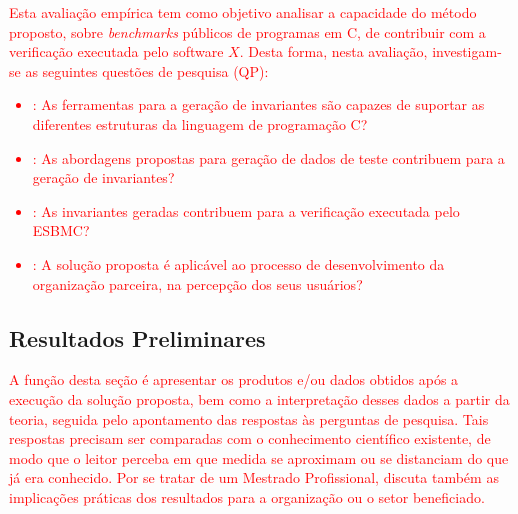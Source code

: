 
\textcolor{red}{Esta avaliação empírica tem como objetivo analisar a capacidade do método proposto, sobre \textit{benchmarks} públicos de programas em C, de contribuir com a verificação executada pelo software $X$. Desta forma, nesta avaliação, investigam-se as seguintes questões de pesquisa (QP):
%
\begin{itemize}
    \item[QP1]: As ferramentas para a geração de invariantes são capazes de suportar as diferentes estruturas da linguagem de programação C?
    \item[QP2]: As abordagens propostas para geração de dados de teste contribuem para a geração de invariantes?
    \item[QP3]: As invariantes geradas contribuem para a verificação executada pelo ESBMC?
    \item[QP4]: A solução proposta é aplicável ao processo de desenvolvimento da organização parceira, na percepção dos seus usuários?
\end{itemize}}




\subsection{Resultados Preliminares}
\label{sub:analise-resultados}


\textcolor{red}{A função desta seção é apresentar os produtos e/ou dados obtidos após a execução da solução proposta, bem como a interpretação desses dados a partir da teoria, seguida pelo apontamento das respostas às perguntas de pesquisa. Tais respostas precisam ser comparadas com o conhecimento científico existente, de modo que o leitor perceba em que medida se aproximam ou se distanciam do que já era conhecido. Por se tratar de um Mestrado Profissional, discuta também as implicações práticas dos resultados para a organização ou o setor beneficiado.}

